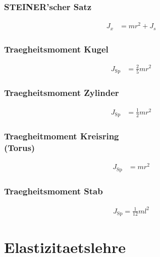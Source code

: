 \begin{multicols}{2}{}
\subsubsection{STEINER'scher Satz}
\begin{align*}
J_x&=mr^2+J_s
\end{align*}

\subsubsection{Traegheitsmoment Kugel}
\begin{align*}
J_\text{Sp}&=\frac{2}{5}mr^2
\end{align*}


\subsubsection{Traegheitsmoment Zylinder}
\begin{align*}
J_\text{Sp}&=\frac{1}{2}mr^2
\end{align*}


\subsubsection{Traegheitmoment Kreisring \\(Torus)}
\begin{align*}
J_\text{Sp}&=mr^2
\end{align*}


\subsubsection{Traegheitsmoment Stab}
\begin{align*}
J_\text{Sp}=\frac{1}{12}ml^2
\end{align*}
\end{multicols}


\newpage
\section{Elastizitaetslehre}

